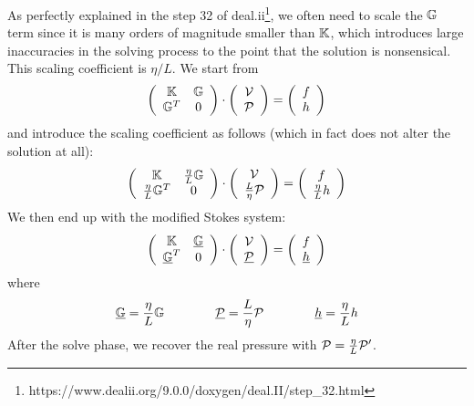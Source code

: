 
As perfectly explained in the step 32 of deal.ii\footnote{https://www.dealii.org/9.0.0/doxygen/deal.II/step\_32.html},
we often need to scale the ${\mathbb{G}}$ term since it is many orders of magnitude smaller than ${\mathbb{K}}$, 
which introduces large inaccuracies in the solving process to the point that the solution is nonsensical. 
This scaling coefficient is $\eta/L$. 
We start from 
\[
\left(
\begin{array}{cc}
{\mathbb{K}} & {\mathbb{G}} \\ {\mathbb{G}}^T & 0 
\end{array}
\right)
\cdot
\left(
\begin{array}{c}
{\cal V} \\ {\cal P}
\end{array}
\right)
=
\left(
\begin{array}{c}
 f \\ h
\end{array}
\right)
\]
and introduce the scaling coefficient as follows (which in fact does not alter the solution at all):
\[
\left(
\begin{array}{cc}
{\mathbb{K}} & \frac{\eta}{L}{\mathbb{G}} \\ \frac{\eta}{L}{\mathbb{G}}^T & 0 
\end{array}
\right)
\cdot
\left(
\begin{array}{c}
{\cal V} \\\frac{L}{\eta} {\cal P}
\end{array}
\right)
=
\left(
\begin{array}{c}
 f \\ \frac{\eta}{L} h
\end{array}
\right)
\]
We then end up with the modified Stokes system:
\[
\left(
\begin{array}{cc}
{\mathbb{K}} & \underline{{\mathbb{G}}} \\ \underline{{\mathbb{G}}}^T & 0 
\end{array}
\right)
\cdot
\left(
\begin{array}{c}
{\cal V} \\ \underline{\cal P}
\end{array}
\right)
=
\left(
\begin{array}{c}
 f \\ \underline{h}
\end{array}
\right)
\]
where 
\[
\underline{{\mathbb{G}}}=\frac{\eta}{L}{\mathbb{G}}
\quad\quad
\quad\quad
\underline{\cal P}=\frac{L}{\eta} {\cal P}
\quad\quad
\quad\quad
\underline{h}=\frac{\eta}{L}h
\]
After the solve phase, we recover the real pressure with ${\cal P}=\frac{\eta}{L}{\cal P}'$.





